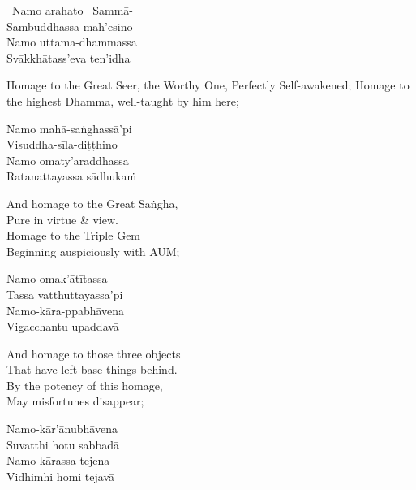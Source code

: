 \begin{pali-hangtogether}
  \anglebracketleft\ \hspace{-0.5mm}Namo arahato \hspace{-0.5mm}\anglebracketright\ Sammā-\\
  Sambuddhassa mah'esino\\
  Namo uttama-dhammassa\\
  Svākkhātass'eva ten'idha
\end{pali-hangtogether}

\begin{english-verses}
  Homage to the Great Seer, the Worthy One, Perfectly Self-awakened; Homage to the highest Dhamma, well-taught by him here;
\end{english-verses}

\begin{pali-hang-continued}
  Namo mahā-saṅghassā'pi\\
  Visuddha-sīla-diṭṭhino\\
  Namo omāty'āraddhassa\\
  Ratanattayassa sādhukaṁ
\end{pali-hang-continued}

\begin{english-verses}
  And homage to the Great Saṅgha,\\
  Pure in virtue \& view.\\
  Homage to the Triple Gem\\
  Beginning auspiciously with AUM;
\end{english-verses}

\begin{pali-hang-continued}
  Namo omak'ātītassa\\
  Tassa vatthuttayassa'pi\\
  Namo-kāra-ppabhāvena\\
  Vigacchantu upaddavā\\
\end{pali-hang-continued}

\begin{english-verses}
  And homage to those three objects\\
  That have left base things behind.\\
  By the potency of this homage,\\
  May misfortunes disappear;
\end{english-verses}

\begin{pali-hang-continued}
  Namo-kār'ānubhāvena\\
  Suvatthi hotu sabbadā\\
  Namo-kārassa tejena\\
  Vidhimhi homi tejavā
\end{pali-hang-continued}

